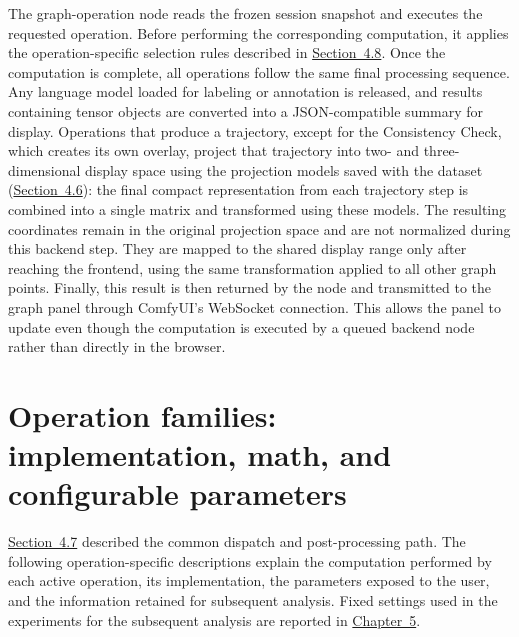 The graph-operation node reads the frozen session snapshot and executes the requested operation. Before performing the corresponding computation, it applies the operation-specific selection rules described in \hyperref[sec:4.8]{Section~4.8}. Once the computation is complete, all operations follow the same final processing sequence. Any language model loaded for labeling or annotation is released, and results containing tensor objects are converted into a JSON-compatible summary for display. Operations that produce a trajectory, except for the Consistency Check, which creates its own overlay, project that trajectory into two- and three-dimensional display space using the projection models saved with the dataset (\hyperref[sec:4.6]{Section~4.6}): the final compact representation from each trajectory step is combined into a single matrix and transformed using these models. The resulting coordinates remain in the original projection space and are not normalized during this backend step. They are mapped to the shared display range only after reaching the frontend, using the same transformation applied to all other graph points. Finally, this result is then returned by the node and transmitted to the graph panel through ComfyUI's WebSocket connection. This allows the panel to update even though the computation is executed by a queued backend node rather than directly in the browser.

\section{Operation families: implementation, math, and configurable parameters}\label{sec:4.8}

\hyperref[sec:4.7]{Section~4.7} described the common dispatch and post-processing path. The following operation-specific descriptions explain the computation performed by each active operation, its implementation, the parameters exposed to the user, and the information retained for subsequent analysis. Fixed settings used in the experiments for the subsequent analysis are reported in \hyperref[ch:results]{Chapter~5}.

